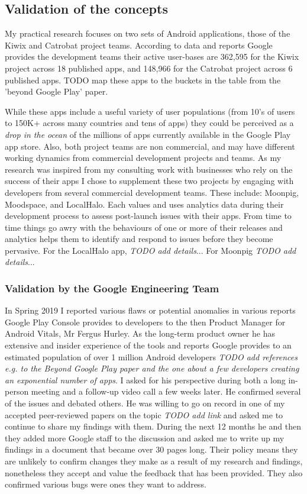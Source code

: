 \subsection{Validation of the concepts}
My practical research focuses on two sets of Android applications, those of the Kiwix and Catrobat project teams. According to data and reports Google provides the development teams their active user-bases are 362,595 for the Kiwix project across 18 published apps, and 148,966 for the Catrobat project across 6 published apps. %
TODO map these apps to the buckets in the table from the 'beyond Google Play' paper.

While these apps include a useful variety of user populations (from 10's of users to 150K+ across many countries and tens of apps) they could be perceived as a \emph{drop in the ocean} of the millions of apps currently available in the Google Play app store. Also, both project teams are non commercial, and may have different working dynamics from commercial development projects and teams. As my research was inspired from my consulting work with businesses who rely on the success of their apps I chose to supplement these two projects by engaging with developers from several commercial development teams. These include: Moonpig, Moodspace, and LocalHalo. Each values and uses analytics data during their development process to assess post-launch issues with their apps. From time to time things go awry with the behaviours of one or more of their releases and analytics helps them to identify and respond to issues before they become pervasive. For the LocalHalo app, \emph{TODO add details}... For Moonpig \emph{TODO add details}...

\subsubsection{Validation by the Google Engineering Team}
In Spring 2019 I reported various flaws or potential anomalies in various reports Google Play Console provides to developers to the then Product Manager for Android Vitals, Mr Fergus Hurley. As the long-term product owner he has extensive and insider experience of the tools and reports Google provides to an estimated population of over 1 million Android developers \emph{TODO add references e.g. to the Beyond Google Play paper and the one about a few developers creating an exponential number of apps}. I asked for his perspective during both a long in-person meeting and a follow-up video call a few weeks later. He confirmed several of the issues and debated others. He was willing to go on record in one of my accepted peer-reviewed papers on the topic \emph{TODO add link} and asked me to continue to share my findings with them. During the next 12 months he and then they added more Google staff to the discussion and asked me to write up my findings in a document that became over 30 pages long. Their policy means they are unlikely to confirm changes they make as a result of my research and findings, nonetheless they accept and value the feedback that has been provided. They also confirmed various bugs were ones they want to address.
